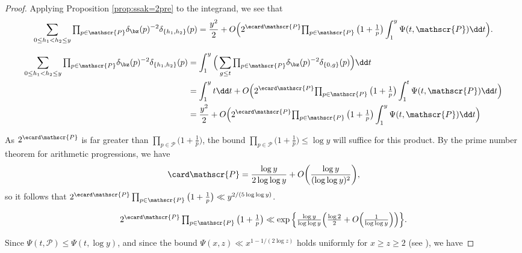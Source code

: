 \documentclass[12pt, reqno, twoside, letterpaper]{amsart}
\begin{document}
\begin{jetsam}
\begin{proof}
Applying Proposition \ref{prop:ssak=2pre} to the integrand, we 
see that 
\begin{equation}
 \label{eq:sssak=2pf2}
   \sum_{0 \le h_1 < h_2 \le y}
   {\textstyle \prod_{p \in \mathscr{P} }} \delta_{\bz}(p)^{-2}\delta_{\{h_1,h_2\}}(p)
 =
    \frac{y^2}{2} 
     +
      O\Big(
            2^{\ecard \mathscr{P}}
            {\textstyle \prod_{p \in \mathscr{P}}  \big(1 + \frac{1}{p}\big) }
              \int_1^y \Psi(t,\mathscr{P}) \dd t 
       \Big).
\end{equation}
%
\begin{nixnix}
%
{\small 
\begin{align*}
   \sum_{0 \le h_1 < h_2 \le y}
   {\textstyle \prod_{p \in \mathscr{P} }} \delta_{\bz}(p)^{-2}\delta_{\{h_1,h_2\}}(p)
 & =
     \int_1^y 
      \Big(\sum_{g \le t} {\textstyle \prod_{p \in \mathscr{P} }} \delta_{\bz}(p)^{-2}\delta_{\{0,g\}}(p)\Big) \dd t
 \\
 & =
    \int_1^y t \dd t  
     +
      O\Big(
          2^{\ecard \mathscr{P}}
         {\textstyle \prod_{p \in \mathscr{P}}  \big(1 + \frac{1}{p}\big) }
          \int_1^t \Psi(t,\mathscr{P}) \dd t 
       \Big)
 \\
 & =
    \frac{y^2}{2} 
     +
      O\Big(
          2^{\ecard \mathscr{P}}
         {\textstyle \prod_{p \in \mathscr{P}}  \big(1 + \frac{1}{p}\big) }
          \int_1^y \Psi(t,\mathscr{P}) \dd t 
       \Big)
\end{align*} 
%
}
\end{nixnix}
%
As $2^{\ecard \mathscr{P}}$ is far greater than 
$\prod_{p \in \mathscr{P}}\big(1 + \frac{1}{p}\big)$, the bound 
$
 \prod_{p \in \mathscr{P}}\big(1 + \frac{1}{p}\big)
  \le
   \log y
$
will suffice for this product.
%
By the prime number theorem for arithmetic progressions, we have 
\[
 \card \mathscr{P}
  =
   \frac{\log y}{2\log\log y}
    +
     O\bigg(\frac{\log y}{(\log\log y)^2}\bigg),
\]
so it follows that 
$
  \textstyle 
 2^{\ecard \mathscr{P}}
     \prod_{p \in \mathscr{P}}  \big(1 + \frac{1}{p}\big)  
  \ll
   y^{2/(5\log\log y)}  
$.
%
\begin{nixnix}
\[
  \textstyle 
 2^{\ecard \mathscr{P}}
     \prod_{p \in \mathscr{P}}  \big(1 + \frac{1}{p}\big)  
  \ll
   \exp\Big\{\frac{\log y}{\log\log y}\Big(\frac{\log 2}{2} + O\Big(\frac{1}{\log\log y}\Big)\Big)\Big\}.
\]
\end{nixnix}
%
Since $\Psi(t,\mathscr{P}) \le \Psi(t,\log y)$, and since the 
bound $\Psi(x,z) \ll x^{1 - 1/(2\log z)}$ holds uniformly for 
$x \ge z \ge 2$ (see \cite[III.5, Theorem 1]{TEN:95}), we have  

\end{proof}
\end{jetsam}
\end{document}
